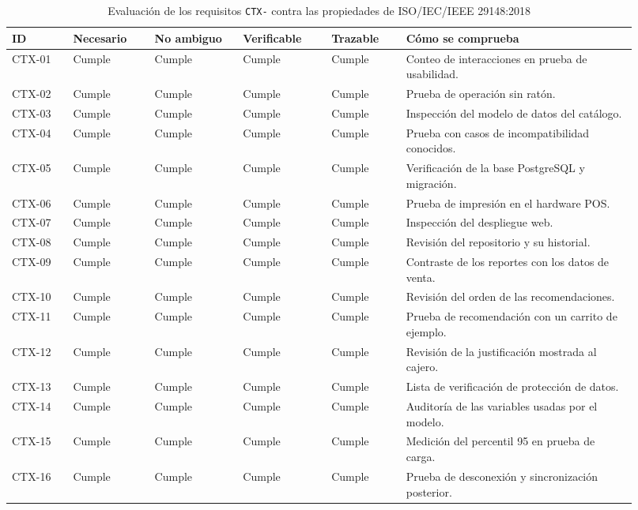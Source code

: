 \documentclass[onecolumn,12pt]{IEEEtran}
\begin{document}
\begin{table}[htbp]
\caption{Evaluaci\'on de los requisitos \texttt{CTX-} contra las propiedades de ISO/IEC/IEEE 29148:2018}
\label{tab:ctx}
\centering
\footnotesize
\begin{tabular}{@{}p{0.09\linewidth}p{0.12\linewidth}p{0.13\linewidth}p{0.13\linewidth}p{0.11\linewidth}p{0.34\linewidth}@{}}
\toprule
\textbf{ID} & \textbf{Necesario} & \textbf{No ambiguo} & \textbf{Verificable} & \textbf{Trazable} & \textbf{C\'omo se comprueba}\\
\midrule
CTX-01 & Cumple & Cumple & Cumple & Cumple & Conteo de interacciones en prueba de usabilidad.\\
CTX-02 & Cumple & Cumple & Cumple & Cumple & Prueba de operaci\'on sin rat\'on.\\
CTX-03 & Cumple & Cumple & Cumple & Cumple & Inspecci\'on del modelo de datos del cat\'alogo.\\
CTX-04 & Cumple & Cumple & Cumple & Cumple & Prueba con casos de incompatibilidad conocidos.\\
CTX-05 & Cumple & Cumple & Cumple & Cumple & Verificaci\'on de la base PostgreSQL y migraci\'on.\\
CTX-06 & Cumple & Cumple & Cumple & Cumple & Prueba de impresi\'on en el hardware POS.\\
CTX-07 & Cumple & Cumple & Cumple & Cumple & Inspecci\'on del despliegue web.\\
CTX-08 & Cumple & Cumple & Cumple & Cumple & Revisi\'on del repositorio y su historial.\\
CTX-09 & Cumple & Cumple & Cumple & Cumple & Contraste de los reportes con los datos de venta.\\
CTX-10 & Cumple & Cumple & Cumple & Cumple & Revisi\'on del orden de las recomendaciones.\\
CTX-11 & Cumple & Cumple & Cumple & Cumple & Prueba de recomendaci\'on con un carrito de ejemplo.\\
CTX-12 & Cumple & Cumple & Cumple & Cumple & Revisi\'on de la justificaci\'on mostrada al cajero.\\
CTX-13 & Cumple & Cumple & Cumple & Cumple & Lista de verificaci\'on de protecci\'on de datos.\\
CTX-14 & Cumple & Cumple & Cumple & Cumple & Auditor\'ia de las variables usadas por el modelo.\\
CTX-15 & Cumple & Cumple & Cumple & Cumple & Medici\'on del percentil 95 en prueba de carga.\\
CTX-16 & Cumple & Cumple & Cumple & Cumple & Prueba de desconexi\'on y sincronizaci\'on posterior.\\
\bottomrule
\end{tabular}
\end{table}
\end{document}
